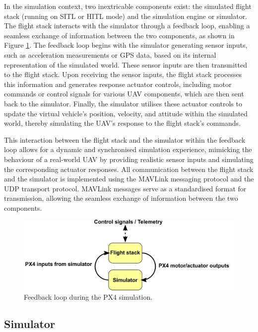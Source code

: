 In the simulation context, two inextricable components exist: the simulated flight stack (running on SITL or HITL mode) and the simulation engine or simulator. The flight stack interacts with the simulator through a feedback loop, enabling a seamless exchange of information between the two components, as shown in Figure \ref{fig:simulator-loop}.
The feedback loop begins with the simulator generating sensor inputs, such as acceleration measurements or GPS data, based on its internal representation of the simulated world. These sensor inputs are then transmitted to the flight stack.
Upon receiving the sensor inputs, the flight stack processes this information and generates response actuator controls, including motor commands or control signals for various UAV components, which are then sent back to the simulator. Finally, the simulator utilises these actuator controls to update the virtual vehicle's position, velocity, and attitude within the simulated world, thereby simulating the UAV's response to the flight stack's commands. 

This interaction between the flight stack and the simulator within the feedback loop allows for a dynamic and synchronised simulation experience, mimicking the behaviour of a real-world UAV by providing realistic sensor inputs and simulating the corresponding actuator responses.
All communication between the flight stack and the simulator is implemented using the MAVLink messaging protocol and the UDP transport protocol. MAVLink messages serve as a standardised format for transmission, allowing the seamless exchange of information between the two components.

\begin{figure}
  \centering
  \includegraphics[width=\textwidth,keepaspectratio]{img/px4-simulator-loop.png}
  \caption{Feedback loop during the PX4 simulation.}
  \label{fig:simulator-loop}
\end{figure}

\subsection{Simulator}

